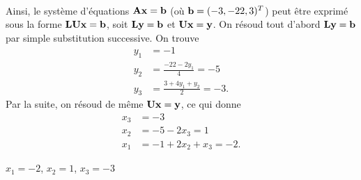 \begin{exercice}
\begin{sol}
\begin{align*}
    \end{align*}
    Ainsi, le système d'équations $\mathbf{A} \mathbf{x} = \mathbf{b}$ (où
    $\mathbf{b} = (-3, -22, 3)^T$) peut être exprimé sous la forme
    $\mathbf{L} \mathbf{U} \mathbf{x} = \mathbf{b}$, soit $\mathbf{L} \mathbf{y} =
    \mathbf{b}$ et $\mathbf{U} \mathbf{x} = \mathbf{y}$. On résoud tout d'abord
    $\mathbf{L} \mathbf{y} = \mathbf{b}$ par simple substitution successive. On
    trouve
    \begin{align*}
      y_1 &= - 1 \\
      y_2 &= \frac{-22 - 2 y_1}{4} = -5 \\
      y_3 &= \frac{3 + 4 y_1 + y_2}{2} = -3.
    \end{align*}
    Par la suite, on résoud de même $\mathbf{U} \mathbf{x} = \mathbf{y}$, ce
    qui donne
    \begin{align*}
      x_3 &= -3 \\
      x_2 &= -5 - 2 x_3 = 1 \\
      x_1 &= -1 + 2 x_2 + x_3 = -2.
    \end{align*}
  \end{sol}
  \begin{rep}
    $x_1 = -2$, $x_2 = 1$, $x_3 = -3$
  \end{rep}
\end{exercice}

